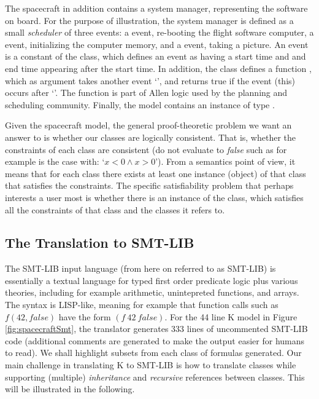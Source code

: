 The spacecraft in addition contains a system manager, representing
the software on board. For the purpose of illustration, the system manager is defined as a small {\em scheduler} of three events: 
a  event, re-booting the flight software computer, a  event, initializing the computer memory, and a 
 event, taking a picture. An event is a constant
of the  class, which defines an event as having a start time and and end time appearing after the start time. In addition, the  class defines a function ,
which as argument takes another event `', 
and returns true if the event (this) occurs after `'.
The  function is part of Allen logic 
\cite{allen-logic-84} used by the planning and scheduling community. 
%
Finally, the model contains an instance  of type
.

Given the spacecraft model, the general proof-theoretic
problem we want an answer to is whether our classes are logically consistent. That is, whether the constraints of each class are consistent (do not evaluate to {\em false} such as for example is
the case with: `$x < 0 \wedge x > 0$'). From a semantics point of view, it means that for each class there exists at least one instance (object) of that class that satisfies the constraints. 
The specific satisfiability problem that perhaps interests a
user most is whether there is an instance of the  class, which satisfies all the constraints of that class and the classes it refers to.



\subsection{The Translation to SMT-LIB}

The SMT-LIB input language (from here on referred to as SMT-LIB)
is essentially a textual language for typed first order predicate logic plus various theories, including for example arithmetic,
unintepreted functions, and arrays. The syntax is LISP-like,
meaning for example that function calls such as $f(42,false)$
have the form $(f\ 42\ false)$. For the 44 line K model in Figure 
\ref{fig:spacecraftSmt}, the translator generates 333 lines of 
uncommented SMT-LIB code  (additional comments are generated to 
make the output easier for 
humans to read). We shall highlight subsets from each class of
formulas generated. Our main challenge in translating K to SMT-LIB 
is how to translate classes while supporting (multiple) {\em 
inheritance} and {\em recursive} references between 
classes. This will be illustrated in the following. 

